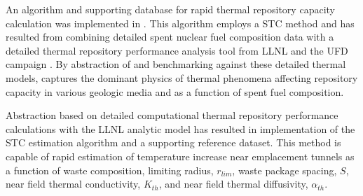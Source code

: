 
An algorithm and supporting database for rapid thermal repository capacity 
calculation was implemented in \Cyder.  This algorithm employs a \gls{STC} 
method \cite{radel_effect_2007, radel_repository_2007} and has resulted from 
combining detailed spent nuclear fuel composition data \cite{carter_fuel_2011} 
with a detailed thermal repository performance analysis tool from \gls{LLNL} 
and the \gls{UFD} campaign \cite{greenberg_application_2012}. By abstraction of 
and benchmarking against these detailed thermal models, \Cyder captures the 
dominant physics of thermal phenomena affecting repository capacity in various 
geologic media and as a function of spent fuel composition.

Abstraction based on detailed computational thermal repository performance 
calculations with the \gls{LLNL} analytic model has resulted in implementation 
of the \gls{STC} estimation algorithm and a supporting reference dataset.  This 
method is capable of rapid estimation of temperature increase near emplacement 
tunnels as a function of waste composition, limiting radius, $r_{lim}$, waste 
package spacing, $S$, near field thermal conductivity, $K_{th}$, and near field 
thermal diffusivity, $\alpha_{th}$.
